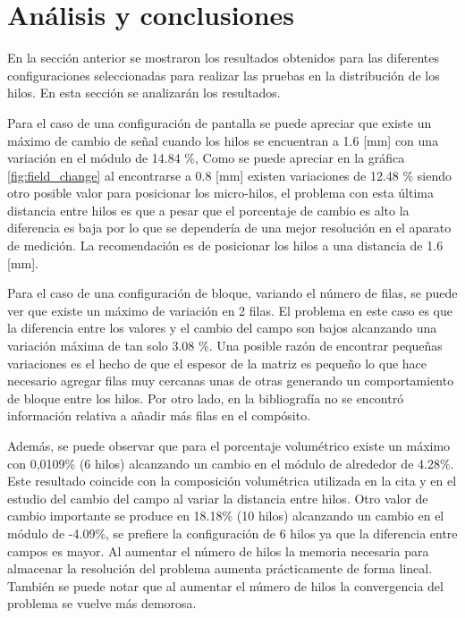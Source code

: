 \documentclass[12pt,letterpaper]{article}
\numberwithin{equation}{section}
\begin{document}
\section{Análisis y conclusiones} \label{sec:Analisis y conclusiones}
En la sección anterior se mostraron los resultados obtenidos para las diferentes configuraciones seleccionadas para realizar las pruebas en la distribución de los hilos. En esta sección se analizarán los resultados.

Para el caso de una configuración de pantalla se puede apreciar que existe un máximo de cambio de señal cuando los hilos se encuentran a 1.6 [mm] con una variación en el módulo de 14.84 \%, Como se puede apreciar en la gráfica \ref{fig:field_change} al encontrarse a 0.8 [mm] existen variaciones de 12.48 \% siendo otro posible valor para posicionar los micro-hilos, el problema con esta última distancia entre hilos es que a pesar que el porcentaje de cambio es alto la diferencia es baja por lo que se dependería de una mejor resolución en el aparato de medición. La recomendación es de posicionar los hilos a una distancia de 1.6 [mm]. 

Para el caso de una configuración de bloque, variando el número de filas, se puede ver que existe un máximo de variación en 2 filas. El problema en este caso es que la diferencia entre los valores y el cambio del campo son bajos alcanzando una variación máxima de tan solo 3.08 \%. Una posible razón de encontrar pequeñas variaciones es el hecho de que el espesor de la matriz es pequeño lo que hace necesario agregar filas muy cercanas unas de otras generando un comportamiento de bloque entre los hilos. Por otro lado, en la bibliografía no se encontró información relativa a añadir más filas en el compósito.

Además, se puede observar que para el porcentaje volumétrico existe un máximo con 0,0109\% (6 hilos) alcanzando un cambio en el módulo de alrededor de 4.28\%. Este resultado coincide con la composición volumétrica utilizada en la cita \cite{Wire_theory_1} y en el estudio del cambio del campo al variar la distancia entre hilos. Otro valor de cambio importante se produce en 18.18\% (10 hilos) alcanzando un cambio en el módulo de -4.09\%, se prefiere la configuración de 6 hilos ya que la diferencia entre campos es mayor. Al aumentar el número de hilos la memoria necesaria para almacenar la resolución del problema aumenta prácticamente de forma lineal. También se puede notar que al aumentar el número de hilos la convergencia del problema se vuelve más demorosa.
\end{document}
